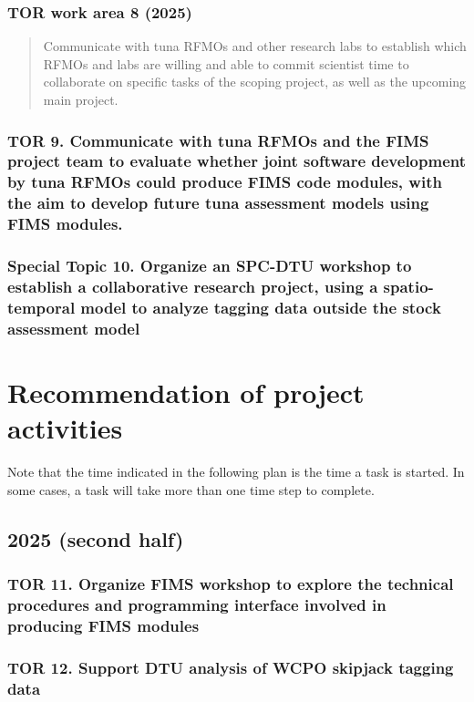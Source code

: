 \documentclass{SCreport}
\begin{document}
\newpage

\subsubsection{TOR work area 8 (2025)}

\begin{quote}\sf
  Communicate with tuna RFMOs and other research labs to establish which RFMOs
  and labs are willing and able to commit scientist time to collaborate on
  specific tasks of the scoping project, as well as the upcoming main project.
\end{quote}

\subsubsection{TOR 9. Communicate with tuna RFMOs and the FIMS project team to
  evaluate whether joint software development by tuna RFMOs could produce FIMS
  code modules, with the aim to develop future tuna assessment models using FIMS
  modules.}

\hypertarget{link:tagging-index}{}
\subsubsection{Special Topic 10. Organize an SPC-DTU workshop to establish a collaborative
  research project, using a spatio-temporal model to analyze tagging data
  outside the stock assessment model}

\section{Recommendation of project activities}

Note that the time indicated in the following plan is the time a task is
started. In some cases, a task will take more than one time step to complete.

\subsection{2025 (second half)}

\subsubsection{TOR 11. Organize FIMS workshop to explore the technical
  procedures and programming interface involved in producing FIMS modules}

\subsubsection{TOR 12. Support DTU analysis of WCPO skipjack tagging data}
\end{document}
